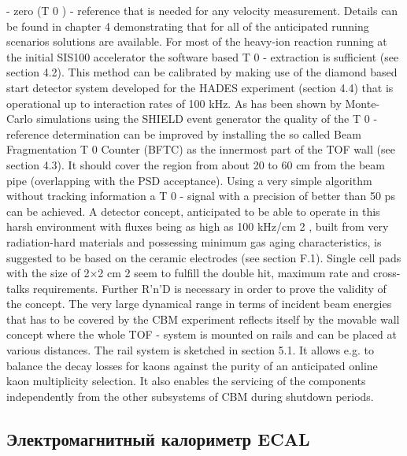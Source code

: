- zero (T 0 ) - reference that is needed for any velocity measurement. Details can be found in chapter 4
demonstrating that for all of the anticipated running scenarios solutions are available. For most of the
heavy-ion reaction running at the initial SIS100 accelerator the software based T 0 - extraction is sufficient
(see section 4.2). This method can be calibrated by making use of the diamond based start detector
system developed for the HADES experiment (section 4.4) that is operational up to interaction rates of
100 kHz.
As has been shown by Monte-Carlo simulations using the SHIELD event generator the quality of the T 0
- reference determination can be improved by installing the so called Beam Fragmentation T 0 Counter
(BFTC) as the innermost part of the TOF wall (see section 4.3). It should cover the region from about
20 to 60 cm from the beam pipe (overlapping with the PSD acceptance). Using a very simple algorithm
without tracking information a T 0 - signal with a precision of better than 50 ps can be achieved. A detector
concept, anticipated to be able to operate in this harsh environment with fluxes being as high as 100
kHz/cm 2 , built from very radiation-hard materials and possessing minimum gas aging characteristics, is
suggested to be based on the ceramic electrodes (see section F.1). Single cell pads with the size of 2$\times$2
cm 2 seem to fulfill the double hit, maximum rate and cross-talks requirements. Further R'n'D is necessary
in order to prove the validity of the concept.
The very large dynamical range in terms of incident beam energies that has to be covered by the CBM
experiment reflects itself by the movable wall concept where the whole TOF - system is mounted on rails
and can be placed at various distances. The rail system is sketched in section 5.1. It allows e.g. to
balance the decay losses for kaons against the purity of an anticipated online kaon multiplicity selection.
It also enables the servicing of the components independently from the other subsystems of CBM during
shutdown periods.


\subsection{Электромагнитный калориметр ECAL}\label{sec:secECAL}


